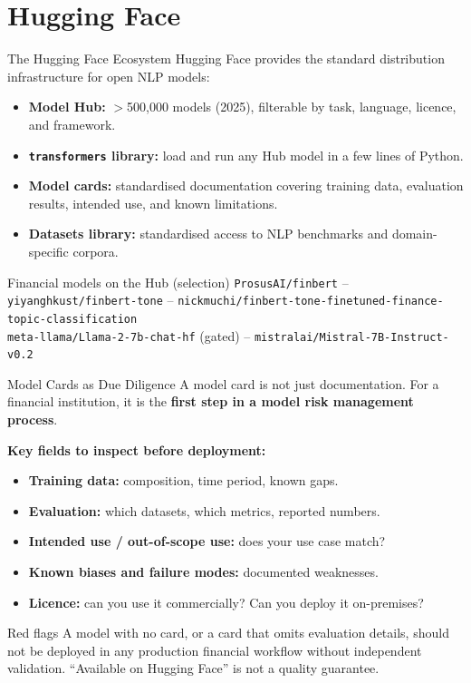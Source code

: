\documentclass[11pt,aspectratio=169,professionalfonts]{beamer}
\begin{document}
\section{Hugging Face}
%
\begin{frame}{The Hugging Face Ecosystem}
  Hugging Face provides the standard distribution infrastructure for
  open NLP models:
  \begin{itemize}
    \item \textbf{Model Hub:} $>$500{,}000 models (2025), filterable
          by task, language, licence, and framework.
    \item \textbf{\texttt{transformers} library:} load and run any Hub
          model in a few lines of Python.
    \item \textbf{Model cards:} standardised documentation covering
          training data, evaluation results, intended use, and known
          limitations.
    \item \textbf{Datasets library:} standardised access to NLP
          benchmarks and domain-specific corpora.
  \end{itemize}

  \begin{exampleblock}{Financial models on the Hub (selection)}
    \texttt{ProsusAI/finbert} --
    \texttt{yiyanghkust/finbert-tone} --
    \texttt{nickmuchi/finbert-tone-finetuned-finance-topic-classification}\\
    \texttt{meta-llama/Llama-2-7b-chat-hf} (gated) --
    \texttt{mistralai/Mistral-7B-Instruct-v0.2}
  \end{exampleblock}
\end{frame}
%
%
\begin{frame}{Model Cards as Due Diligence}
  A model card is not just documentation.
  For a financial institution, it is the \textbf{first step in a model
  risk management process}.

  \medskip
  \textbf{Key fields to inspect before deployment:}
  \begin{itemize}
    \item \textbf{Training data:} composition, time period, known gaps.
    \item \textbf{Evaluation:} which datasets, which metrics, reported numbers.
    \item \textbf{Intended use / out-of-scope use:} does your use case match?
    \item \textbf{Known biases and failure modes:} documented weaknesses.
    \item \textbf{Licence:} can you use it commercially?
          Can you deploy it on-premises?
  \end{itemize}

  \begin{alertblock}{Red flags}
    A model with no card, or a card that omits evaluation details,
    should not be deployed in any production financial workflow without
    independent validation.
    ``Available on Hugging Face'' is not a quality guarantee.
  \end{alertblock}
\end{frame}
\end{document}
